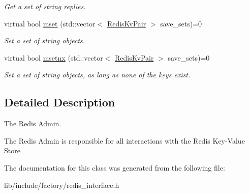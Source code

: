 \begin{DoxyCompactItemize}
\begin{DoxyCompactList}\small\item\em Get a set of string replies. \end{DoxyCompactList}\item 
\hypertarget{classRedisInterface_ad396ae3e13286451ff6f494f462cb349}{virtual bool \hyperlink{classRedisInterface_ad396ae3e13286451ff6f494f462cb349}{mset} (std\-::vector$<$ \hyperlink{structRedisKvPair}{Redis\-Kv\-Pair} $>$ save\-\_\-sets)=0}\label{classRedisInterface_ad396ae3e13286451ff6f494f462cb349}

\begin{DoxyCompactList}\small\item\em Set a set of string objects. \end{DoxyCompactList}\item 
\hypertarget{classRedisInterface_ae3281e8788a6f972b7cba305794e53a0}{virtual bool \hyperlink{classRedisInterface_ae3281e8788a6f972b7cba305794e53a0}{msetnx} (std\-::vector$<$ \hyperlink{structRedisKvPair}{Redis\-Kv\-Pair} $>$ save\-\_\-sets)=0}\label{classRedisInterface_ae3281e8788a6f972b7cba305794e53a0}

\begin{DoxyCompactList}\small\item\em Set a set of string objects, as long as none of the keys exist. \end{DoxyCompactList}\end{DoxyCompactItemize}


\subsection{Detailed Description}
The Redis Admin. 

The Redis Admin is responsible for all interactions with the Redis Key-\/\-Value Store 

The documentation for this class was generated from the following file\-:\begin{DoxyCompactItemize}
\item 
lib/include/factory/redis\-\_\-interface.\-h\end{DoxyCompactItemize}
